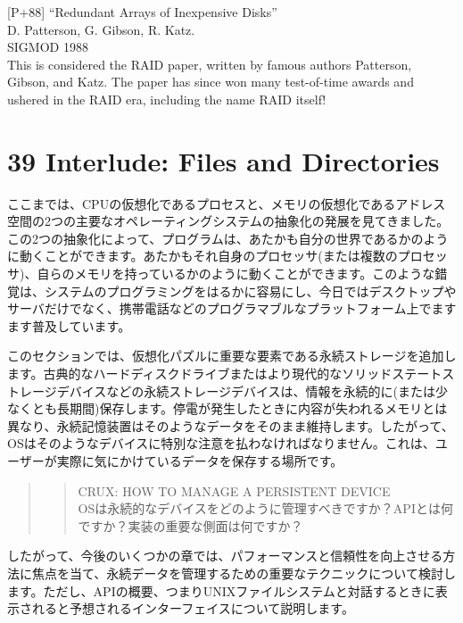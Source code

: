 {[}P+88{]} ``Redundant Arrays of Inexpensive Disks''\\
D. Patterson, G. Gibson, R. Katz.\\
SIGMOD 1988\\
This is considered the RAID paper, written by famous authors Patterson,
Gibson, and Katz. The paper has since won many test-of-time awards and
ushered in the RAID era, including the name RAID itself!

\newpage

\hypertarget{interlude-files-and-directories}{%
\section*{39 Interlude: Files and
Directories}\label{interlude-files-and-directories}}

ここまでは、CPUの仮想化であるプロセスと、メモリの仮想化であるアドレス空間の2つの主要なオペレーティングシステムの抽象化の発展を見てきました。この2つの抽象化によって、プログラムは、あたかも自分の世界であるかのように動くことができます。あたかもそれ自身のプロセッサ(または複数のプロセッサ)、自らのメモリを持っているかのように動くことができます。このような錯覚は、システムのプログラミングをはるかに容易にし、今日ではデスクトップやサーバだけでなく、携帯電話などのプログラマブルなプラットフォーム上でますます普及しています。

このセクションでは、仮想化パズルに重要な要素である永続ストレージを追加します。古典的なハードディスクドライブまたはより現代的なソリッドステートストレージデバイスなどの永続ストレージデバイスは、情報を永続的に(または少なくとも長期間)保存します。停電が発生したときに内容が失われるメモリとは異なり、永続記憶装置はそのようなデータをそのまま維持します。したがって、OSはそのようなデバイスに特別な注意を払わなければなりません。これは、ユーザーが実際に気にかけているデータを保存する場所です。

\begin{quote}
\begin{quote}
CRUX: HOW TO MANAGE A PERSISTENT DEVICE\\
OSは永続的なデバイスをどのように管理すべきですか？APIとは何ですか？実装の重要な側面は何ですか？
\end{quote}
\end{quote}

したがって、今後のいくつかの章では、パフォーマンスと信頼性を向上させる方法に焦点を当て、永続データを管理するための重要なテクニックについて検討します。ただし、APIの概要、つまりUNIXファイルシステムと対話するときに表示されると予想されるインターフェイスについて説明します。

